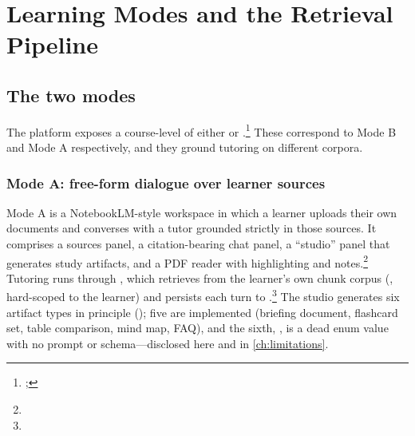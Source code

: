 \chapter{Learning Modes and the Retrieval Pipeline}
\label{ch:modes}


\section{The two modes}
\label{sec:modes-overview}

The platform exposes a course-level  of either
 or .\footnote{;
} These correspond to Mode B and Mode
A respectively, and they ground tutoring on different corpora.

\subsection{Mode A: free-form dialogue over learner sources}
\label{sec:modes-a}

Mode A is a NotebookLM-style workspace in which a learner uploads their own
documents and converses with a tutor grounded strictly in those sources.
It comprises a sources panel, a citation-bearing chat panel, a
``studio'' panel that generates study artifacts, and a PDF reader with
highlighting and notes.\footnote{}
Tutoring runs through , which retrieves
from the learner's own chunk corpus (, hard-scoped
to the learner) and persists each turn to
.\footnote{}
The studio generates six artifact types in principle
(); five are implemented (briefing document,
flashcard set, table comparison, mind map, FAQ), and the sixth,
, is a dead enum value with no prompt or schema---disclosed
here and in \cref{ch:limitations}.

